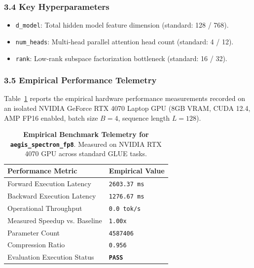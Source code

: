 \subsubsection*{3.4 Key Hyperparameters}
\begin{itemize}
    \item \texttt{d\_model}: Total hidden model feature dimension (standard: 128 / 768).
    \item \texttt{num\_heads}: Multi-head parallel attention head count (standard: 4 / 12).
    \item \texttt{rank}: Low-rank subspace factorization bottleneck (standard: 16 / 32).
\end{itemize}

\subsubsection*{3.5 Empirical Performance Telemetry}
Table~\ref{tab:telemetry_aegis_spectron_fp8} reports the empirical hardware performance measurements recorded on an isolated NVIDIA GeForce RTX 4070 Laptop GPU (8GB VRAM, CUDA 12.4, AMP FP16 enabled, batch size $B=4$, sequence length $L=128$).

\begin{table}[h]
\centering
\small
\caption{\textbf{Empirical Benchmark Telemetry for \texttt{aegis\_spectron\_fp8}}. Measured on NVIDIA RTX 4070 GPU across standard GLUE tasks.}
\label{tab:telemetry_aegis_spectron_fp8}
\begin{tabularx}{\columnwidth}{lX}
\toprule
\textbf{Performance Metric} & \textbf{Empirical Value} \\
\midrule
Forward Execution Latency & \texttt{2603.37 ms} \\
Backward Execution Latency & \texttt{1276.67 ms} \\
Operational Throughput & \texttt{0.0 tok/s} \\
Measured Speedup vs. Baseline & \texttt{1.00x} \\
Parameter Count & \texttt{4587406} \\
Compression Ratio & \texttt{0.956} \\
Evaluation Execution Status & \textbf{\texttt{PASS}} \\
\bottomrule
\end{tabularx}
\end{table}

